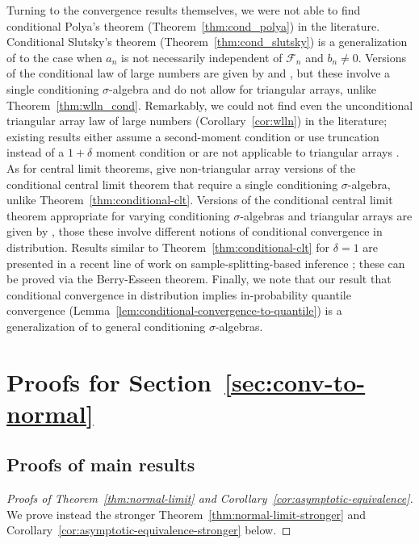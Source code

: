 \documentclass[aos]{imsart}
\theoremstyle{plain}
\theoremstyle{remark}
\begin{document}
Turning to the convergence results themselves, we were not able to find conditional Polya's theorem (Theorem~\ref{thm:cond_polya}) in the literature. Conditional Slutsky's theorem (Theorem~\ref{thm:cond_slutsky}) is a generalization of \citet[Lemma 5]{Wang2020b} to the case when $a_n$ is not necessarily independent of $\mathcal F_n$ and $b_n \neq 0$. Versions of the conditional law of large numbers are given by \cite{Majerek2005a} and \cite{PrakasaRao2009}, but these involve a single conditioning $\sigma$-algebra and do not allow for triangular arrays, unlike Theorem~\ref{thm:wlln_cond}. Remarkably, we could not find even the unconditional triangular array law of large numbers (Corollary~\ref{cor:wlln}) in the literature; existing results either assume a second-moment condition or use truncation \citep[Theorems 2.2.4 and 2.2.6, respectively]{Durrett2010} instead of a $1+\delta$ moment condition or are not applicable to triangular arrays \citep[Lemma 19]{Shah2018}. As for central limit theorems, \citet{Grzenda2008, PrakasaRao2009, Yuan2014} give non-triangular array versions of the conditional central limit theorem that require a single conditioning $\sigma$-algebra, unlike Theorem~\ref{thm:conditional-clt}. Versions of the conditional central limit theorem appropriate for varying conditioning $\sigma$-algebras and triangular arrays are given by \citet{Dedecker2002, bulinski2017conditional}, those these involve different notions of conditional convergence in distribution. Results similar to Theorem~\ref{thm:conditional-clt} for $\delta = 1$ are presented in a recent line of work on sample-splitting-based inference \citep{Kim2020a, Shekhar2022a, Shekhar2022}; these can be proved via the Berry-Esseen theorem. Finally, we note that our result that conditional convergence in distribution implies in-probability quantile convergence (Lemma~\ref{lem:conditional-convergence-to-quantile}) is a generalization of \citet[Lemma 3]{Wang2020b} to general conditioning $\sigma$-algebras.

\section{Proofs for Section~\ref{sec:conv-to-normal}}

\subsection{Proofs of main results}

\begin{proof}[Proofs of Theorem~\ref{thm:normal-limit} and Corollary~\ref{cor:asymptotic-equivalence}] 
We prove instead the stronger Theorem~\ref{thm:normal-limit-stronger} and Corollary~\ref{cor:asymptotic-equivalence-stronger} below.
\end{proof}
\end{document}
